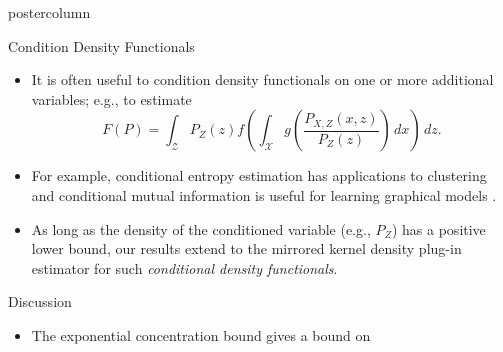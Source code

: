 \documentclass[final,hyperref={pdfpagelabels=false}]{beamer}
\newcommand{\X}{\mathcal{X}}
\newcommand{\Z}{\mathcal{Z}}
\newlength{\columnheight}
\begin{document}
\begin{frame}
\begin{columns}
    \begin{column}{.32\textwidth}
      \begin{beamercolorbox}[center,wd=\textwidth]{postercolumn}
        \begin{minipage}[T]{.95\textwidth} %
          \parbox[t][\columnheight]{\textwidth}{ %
            \vfill
            \begin{block}{Condition Density Functionals}
                  \begin{itemize}
                  \item It is often useful to condition density functionals on
                        one or more additional variables; e.g., to estimate
                        \[F(P)
                            = \int_\Z P_Z(z) f\left(
                                    \int_\X g\left(
                                        \frac{P_{X,Z}(x,z)}{P_Z(z)}
                                    \right) \, dx
                                \right) \, dz.\]
                  \item For example, conditional entropy estimation has
                        applications to clustering \cite{steeg2013demystifying}
                        and conditional mutual information is useful for
                        learning graphical models
                        \cite{koller09probgraphmodels}.
                  \item As long as the density of the conditioned variable
                        (e.g., $P_Z$) has a positive lower bound, our results
                        extend to the mirrored kernel density plug-in
                        estimator for such
                        \emph{conditional density functionals}.
                  \end{itemize}
            \end{block}
            \vfill
            \begin{block}{Discussion}
                  \begin{itemize}
                  \item The exponential concentration bound gives a bound on

\end{itemize}
\end{block}}
\end{minipage}
\end{beamercolorbox}
\end{column}
\end{columns}
\end{frame}
\end{document}
